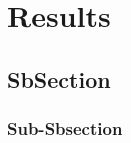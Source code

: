 \newpage
\section{Results}
\label{sec:Section06}

\subsection{SbSection}
\label{sec:Section0x.a-}

\subsubsection{Sub-Sbsection}